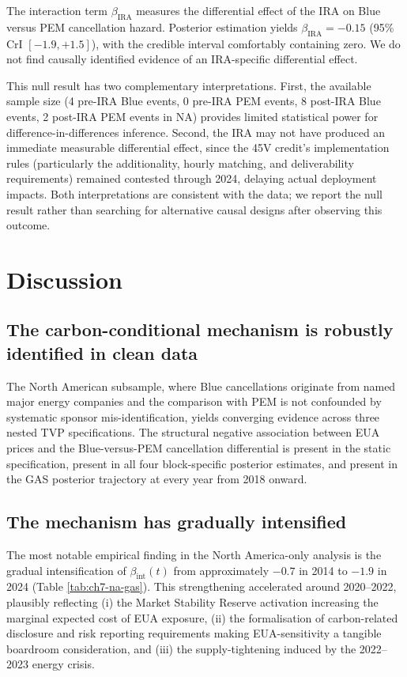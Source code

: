 \documentclass[11pt,a4paper]{article}
\newcommand{\bint}{\beta_{\mathrm{int}}}
\begin{document}
The interaction term $\beta_{\mathrm{IRA}}$ measures the differential effect of the IRA on Blue versus PEM cancellation hazard. Posterior estimation yields $\beta_{\mathrm{IRA}} = -0.15$ (95\% CrI $[-1.9, +1.5]$), with the credible interval comfortably containing zero. We do not find causally identified evidence of an IRA-specific differential effect.

This null result has two complementary interpretations. First, the available sample size (4 pre-IRA Blue events, 0 pre-IRA PEM events, 8 post-IRA Blue events, 2 post-IRA PEM events in NA) provides limited statistical power for difference-in-differences inference. Second, the IRA may not have produced an immediate measurable differential effect, since the 45V credit's implementation rules (particularly the additionality, hourly matching, and deliverability requirements) remained contested through 2024, delaying actual deployment impacts. Both interpretations are consistent with the data; we report the null result rather than searching for alternative causal designs after observing this outcome.

\section{Discussion}
\label{sec:ch7-discussion}

\subsection{The carbon-conditional mechanism is robustly identified in clean data}

The North American subsample, where Blue cancellations originate from named major energy companies and the comparison with PEM is not confounded by systematic sponsor mis-identification, yields converging evidence across three nested TVP specifications. The structural negative association between EUA prices and the Blue-versus-PEM cancellation differential is present in the static specification, present in all four block-specific posterior estimates, and present in the GAS posterior trajectory at every year from 2018 onward.

\subsection{The mechanism has gradually intensified}

The most notable empirical finding in the North America-only analysis is the gradual intensification of $\bint(t)$ from approximately $-0.7$ in 2014 to $-1.9$ in 2024 (Table \ref{tab:ch7-na-gas}). This strengthening accelerated around 2020--2022, plausibly reflecting (i) the Market Stability Reserve activation increasing the marginal expected cost of EUA exposure, (ii) the formalisation of carbon-related disclosure and risk reporting requirements making EUA-sensitivity a tangible boardroom consideration, and (iii) the supply-tightening induced by the 2022--2023 energy crisis.
\end{document}
